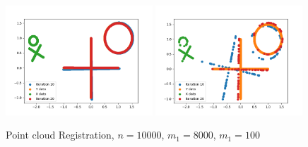 \documentclass[11pt]{beamer}
\begin{document}

\begin{frame}
\begin{figure}[H]
\centering
\includegraphics[width=0.49\textwidth, trim = 0cm 1cm 0cm 0cm]{circle_cross_shape.png}
\includegraphics[width=0.49\textwidth, trim = 0cm 1cm 0cm 0cm]{circle_cross_shape2.png}
\caption{Point cloud Registration, $n=10000$, $m_1=8000$, $m_1=100$}\label{cc_shape}
\end{figure}
\end{frame}
\end{document}
